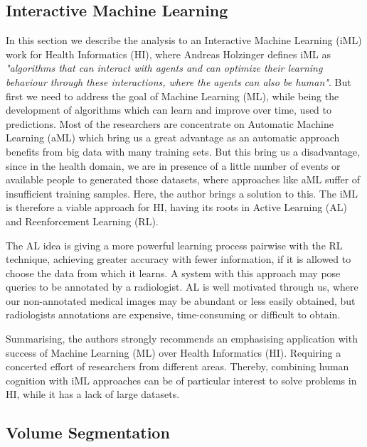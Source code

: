 \subsection{Interactive Machine Learning}

In this section we describe the analysis to an Interactive Machine Learning (iML) work for Health Informatics (HI), where Andreas Holzinger \cite{holzinger2016interactive} defines iML as \textit{"algorithms that can interact with agents and can optimize their learning behaviour through these interactions, where the agents can also be human"}. But first we need to address the goal of Machine Learning (ML), while being the development of algorithms which can learn and improve over time, used to predictions. Most of the researchers are concentrate on Automatic Machine Learning (aML) which bring us a great advantage as an automatic approach benefits from big data with many training sets. But this bring us a disadvantage, since in the health domain, we are in presence of a little number of events or available people to generated those datasets, where approaches like aML suffer of insufficient training samples. Here, the author brings a solution to this. The iML is therefore a viable approach for HI, having its roots in Active Learning (AL) and Reenforcement Learning (RL).

\clearpage

The AL idea is giving a more powerful learning process pairwise with the RL technique, achieving greater accuracy with fewer information, if it is allowed to choose the data from which it learns. A system with this approach may pose queries to be annotated by a radiologist. AL is well motivated through us, where our non-annotated medical images may be abundant or less easily obtained, but radiologists annotations are expensive, time-consuming or difficult to obtain.

Summarising, the authors strongly recommends an emphasising application with success of Machine Learning (ML) over Health Informatics (HI). Requiring a concerted effort of researchers from different areas. Thereby, combining human cognition with iML approaches can be of particular interest to solve problems in HI, while it has a lack of large datasets.

\subsection{Volume Segmentation}

